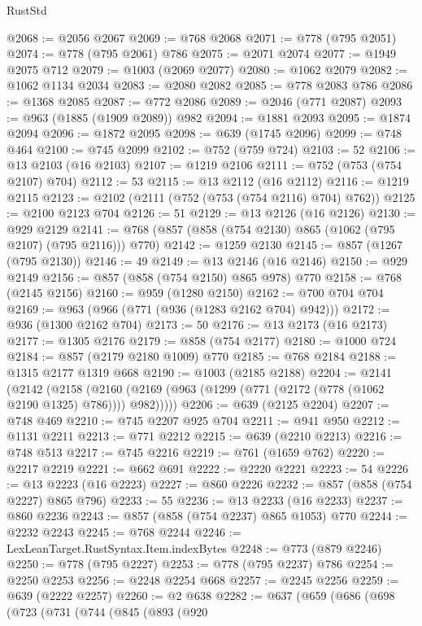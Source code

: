 \begin{lexlean}{RustStd}
\begin{coremodule}
@2068 := @2056 @2067
@2069 := @768 @2068
@2071 := @778 (@795 @2051)
@2074 := @778 (@795 @2061) @786
@2075 := @2071 @2074
@2077 := @1949 @2075 @712
@2079 := @1003 (@2069 @2077)
@2080 := @1062 @2079
@2082 := @1062 @1134 @2034
@2083 := @2080 @2082
@2085 := @778 @2083 @786
@2086 := @1368 @2085
@2087 := @772 @2086
@2089 := @2046 (@771 @2087)
@2093 := @963 (@1885 (@1909 @2089)) @982
@2094 := @1881 @2093
@2095 := @1874 @2094
@2096 := @1872 @2095
@2098 := @639 (@1745 @2096)
@2099 := @748 @464
@2100 := @745 @2099
@2102 := @752 (@759 @724)
@2103 := 52
@2106 := @13 @2103 (@16 @2103)
@2107 := @1219 @2106
@2111 := @752 (@753 (@754 @2107) @704)
@2112 := 53
@2115 := @13 @2112 (@16 @2112)
@2116 := @1219 @2115
@2123 := @2102 (@2111 (@752 (@753 (@754 @2116) @704) @762))
@2125 := @2100 @2123 @704
@2126 := 51
@2129 := @13 @2126 (@16 @2126)
@2130 := @929 @2129
@2141 := @768 (@857 (@858 (@754 @2130) @865 (@1062 (@795 @2107) (@795 @2116))) @770)
@2142 := @1259 @2130
@2145 := @857 (@1267 (@795 @2130))
@2146 := 49
@2149 := @13 @2146 (@16 @2146)
@2150 := @929 @2149
@2156 := @857 (@858 (@754 @2150) @865 @978) @770
@2158 := @768 (@2145 @2156)
@2160 := @959 (@1280 @2150)
@2162 := @700 @704 @704
@2169 := @963 (@966 (@771 (@936 (@1283 @2162 @704) @942)))
@2172 := @936 (@1300 @2162 @704)
@2173 := 50
@2176 := @13 @2173 (@16 @2173)
@2177 := @1305 @2176
@2179 := @858 (@754 @2177)
@2180 := @1000 @724
@2184 := @857 (@2179 @2180 @1009) @770
@2185 := @768 @2184
@2188 := @1315 @2177 @1319 @668
@2190 := @1003 (@2185 @2188)
@2204 := @2141
    (@2142
      (@2158 (@2160 (@2169 (@963 (@1299 (@771 (@2172 (@778 (@1062 @2190 @1325) @786)))) @982)))))
@2206 := @639 (@2125 @2204)
@2207 := @748 @469
@2210 := @745 @2207 @925 @704
@2211 := @941 @950
@2212 := @1131 @2211
@2213 := @771 @2212
@2215 := @639 (@2210 @2213)
@2216 := @748 @513
@2217 := @745 @2216
@2219 := @761 (@1659 @762)
@2220 := @2217 @2219
@2221 := @662 @691
@2222 := @2220 @2221
@2223 := 54
@2226 := @13 @2223 (@16 @2223)
@2227 := @860 @2226
@2232 := @857 (@858 (@754 @2227) @865 @796)
@2233 := 55
@2236 := @13 @2233 (@16 @2233)
@2237 := @860 @2236
@2243 := @857 (@858 (@754 @2237) @865 @1053) @770
@2244 := @2232 @2243
@2245 := @768 @2244
@2246 := LexLeanTarget.RustSyntax.Item.indexBytes
@2248 := @773 (@879 @2246)
@2250 := @778 (@795 @2227)
@2253 := @778 (@795 @2237) @786
@2254 := @2250 @2253
@2256 := @2248 @2254 @668
@2257 := @2245 @2256
@2259 := @639 (@2222 @2257)
@2260 := @2 @638
@2282 := @637
    (@659
      (@686
        (@698
          (@723
            (@731
              (@744
                (@845
                  (@893
                    (@920

\end{coremodule}
\end{lexlean}
